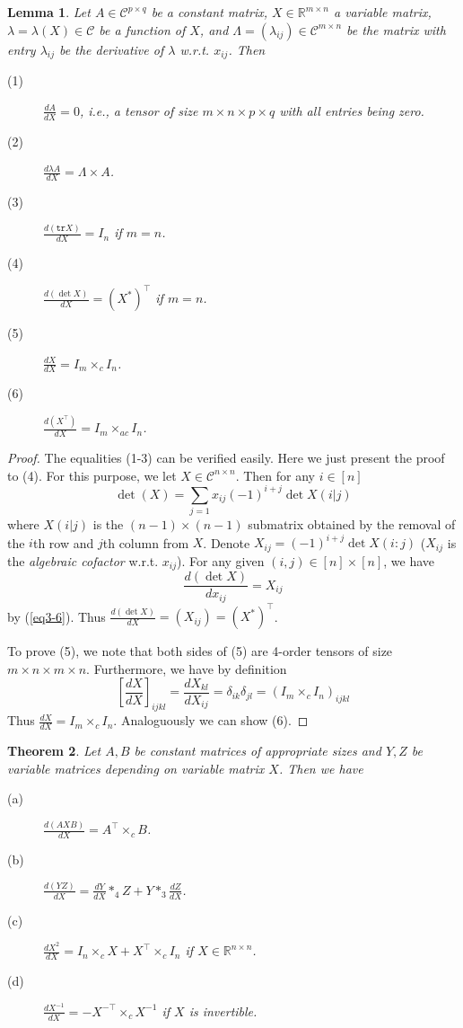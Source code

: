 \documentclass[11pt, oneside]{article}  %
\newtheorem{thm}{Theorem}[section]
\newtheorem{lem}[thm]{Lemma}
\newcommand{\tr}{\texttt{tr}}
\newcommand{\la}{\lambda}
\newcommand{\La}{\Lambda}
\newcommand{\RR}{\mathbb{R}}
\newcommand{\C}{\mathcal{C}}
\newcommand{\beq}{\begin{equation}}
\newcommand{\eeq}{\end{equation}}
\begin{document}
\begin{lem}\label{le3-1}
Let $A\in\C^{p\times q}$ be a constant matrix, $X\in\RR^{m\times n}$ a variable matrix, $\la=\la(X)\in\C$ be a function of $X$, and 
$\La=(\la_{ij})\in\C^{m\times n}$ be the matrix with entry $\la_{ij}$ be the derivative of $\la$ w.r.t. $x_{ij}$.  Then 
\begin{description}
\item[(1)]  $\frac{d A}{d X}=0$, i.e., a tensor of size $m\times n\times p\times q$ with all entries being zero.   
\item[(2)]  $\frac{d \la A}{d X}=\La\times A$. 
\item[(3)] $\frac{d(\tr X)}{dX} = I_{n}$ if $m=n$. 
\item[(4)] $\frac{d(\det X)}{dX}= (X^{\ast})^{\top}$ if $m=n$.
\item[(5)] $\frac{d X}{d X}= I_{m}\times_{c} I_{n}$.
\item[(6)] $\frac{d(X^{\top})}{dX}= I_{m}\times_{ac} I_{n}$.
\end{description}
\end{lem}
\begin{proof}
The equalities (1-3) can be verified easily.  Here we just present the proof to (4).  For this purpose, we let $X\in\C^{n\times n}$. Then for any $i\in [n]$
\beq\label{eq3-6} 
\det(X) = \sum_{j=1} x_{ij}(-1)^{i+j}\det X(i|j)  
\eeq
where $X(i|j)$ is the $(n-1)\times (n-1)$ submatrix obtained by the removal of the $i$th row and $j$th column from $X$. Denote 
$X_{ij}=(-1)^{i+j}\det X(i\colon j)$ ($X_{ij}$ is the \emph{algebraic cofactor} w.r.t. $x_{ij}$).  For any given $(i,j)\in [n]\times [n]$, we have 
\[ \frac{d(\det X)}{d x_{ij}} = X_{ij} \]
by (\ref{eq3-6}).  Thus $\frac{d(\det X)}{dX}=(X_{ij})=(X^{\ast})^{\top}$. \par 
\indent To prove (5), we note that both sides of (5) are 4-order tensors of size $m\times n\times m\times n$.  Furthermore, we have by definition
\[  
\left[\frac{d X}{d X}\right]_{ijkl}=\frac{d X_{kl}}{d X_{ij}}=\delta_{ik}\delta_{jl}= (I_{m}\times_{c} I_{n})_{ijkl} 
\]
Thus $\frac{d X}{d X}=I_{m}\times_{c} I_{n}$.  Analoguously we can show (6).  
\end{proof}
   
\begin{thm}\label{th3-2}
Let $A,B$ be constant matrices of appropriate sizes and $Y,Z$ be variable matrices depending on variable matrix $X$. Then we have 
\begin{description}
\item[(a)] $\frac{d (AXB)}{d X}=A^{\top}\times_{c} B$. 
\item[(b)] $\frac{d (YZ)}{d X}=\frac{dY}{dX}\ast_{4} Z +Y\ast_{3}\frac{dZ}{dX}$.
\item[(c)] $\frac{dX^{2}}{d X}=I_{n}\times_{c} X + X^{\top}\times_{c} I_{n}$ if $X\in\RR^{n\times n}$.
\item[(d)]  $\frac{d X^{-1}}{dX} =-X^{-\top}\times_{c} X^{-1}$ if $X$ is invertible.
\end{description}
\end{thm}
\end{document}
